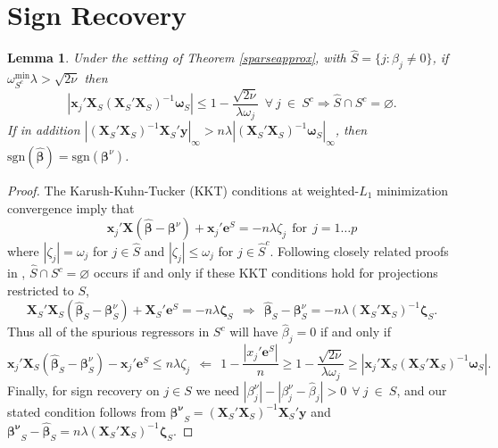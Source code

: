 \documentclass[12pt]{article}
\newtheorem{lemma}{\sc Lemma}[section]
\newcommand{\bs}[1]{\boldsymbol{#1}}
\newcommand{\mr}[1]{\mathrm{#1}}
\newcommand{\bm}[1]{\mathbf{#1}}
\begin{document}
\section{Sign Recovery}
\label{extraproof}


\begin{lemma}\label{signrecov}
Under the setting of Theorem \ref{sparseapprox}, with $\hat S = \{j:\hat\beta_j \neq 0\}$, if $\omega_{S^c}^{\mr{min}}\lambda > \sqrt{2\nu}$ then
\begin{equation}
|\bs{x}_j'\bm{X}_S(\bm{X}_S'\bm{X}_S)^{-1}\bs{\omega}_S| \leq 1 - \frac{\sqrt{2\nu}}{\lambda\omega_j}~~\forall~j ~\in~S^c \Rightarrow \hat{S} \cap S^c = \varnothing.
\end{equation}
 If in addition
$\left|(\bm{X}_S'\bm{X}_S)^{-1}\bm{X}_S'\bm{y}\right|_\infty > n\lambda\left|(\bm{X}_S'\bm{X}_S)^{-1}\bs{\omega}_S\right|_\infty$, then 
$\mr{sgn}(\bs{\hat\beta}) = \mr{sgn}(\bs{\beta}^\nu)$.
\end{lemma}
\begin{proof} 
The Karush-Kuhn-Tucker (KKT) conditions at weighted-$L_1$ minimization convergence imply that 
\begin{equation}
\bm{x}_j'\bm{X}(\bs{\hat\beta}-\bs{\beta}^\nu) + \bm{x}_j'\bm{e}^S = -n\lambda\zeta_j~~\text{for}~~j=1\dots p
\end{equation} where $|\zeta_j| = \omega_j$ for $j\in\hat S$ and $|\zeta_j| \leq \omega_j$ for $j\in\hat S^c$.  Following  closely related proofs in \cite{wainwright_sharp_2006,wainwright_sharp_2009,zhou_adaptive_2009}, 
$\hat{S} \cap S^c = \varnothing$ occurs if and only if these KKT conditions
hold for projections restricted to $S$,
\begin{equation}
\bm{X}_S'\bm{X}_S(\bs{\hat\beta}_S-\bs{\beta}^\nu_S) + \bm{X}_S'\bm{e}^S =-n\lambda\bs{\zeta}_S ~~\Rightarrow~~ \bs{\hat\beta}_S-\bs{\beta}^\nu_S = -n\lambda(\bm{X}_S'\bm{X}_S)^{-1}\bs{\zeta}_S.
\end{equation}
Thus all of the spurious regressors in $S^c$ will have $\hat \beta_j = 0$
if and only if
\begin{equation}
\bs{x}_j'\bm{X}_S(\bs{\hat\beta}_S-\bs{\beta}^\nu_S) - \bs{x}_j'\bm{e}^S 
\leq n\lambda\zeta_j ~~\Leftarrow~~
1 - \frac{|x_j'\bm{e}^S|}{n} \geq 1 - \frac{\sqrt{2\nu}}{\lambda\omega_j} \geq |\bs{x}_j'\bm{X}_S(\bm{X}_S'\bm{X}_S)^{-1}\bs{\omega}_S|.
\end{equation}
Finally, for sign recovery on $j\in S$ we need 
$
|\beta_j^\nu| - |\beta^\nu_j - \hat\beta_j| > 0 ~~\forall~j~\in~S
$,
and our stated condition follows from  $\bs{\beta^\nu}_S =
(\bm{X}_S'\bm{X}_S)^{-1}\bm{X}_S'\bm{y}$ and $ \bs{\beta^\nu}_S-
\bs{\hat\beta}_S = n\lambda (\bm{X}_S'\bm{X}_S)^{-1}\bs{\zeta}_S$.
\end{proof}
\end{document}

